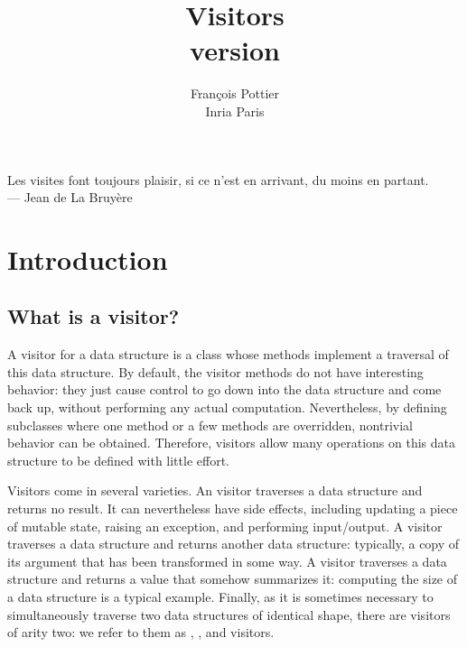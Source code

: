 \documentclass[11pt,a4paper,twoside]{article}
\title{Visitors\\\normalsize version \visitorsversion}
\date{}
\begin{document}
\author{François Pottier\\ Inria Paris\\ }
\maketitle


\clearpage
\tableofcontents
\clearpage


\begin{flushright}
  Les visites font toujours plaisir, si ce n'est en arrivant, du moins en
  partant. \\ --- Jean de La Bruyère
\end{flushright}

\vspace{1cm}


\section{Introduction}
\label{sec:intro}


\subsection{What is a visitor?}

A visitor for a data structure is a class whose methods implement a traversal
of this data structure. By default, the visitor methods do not have
interesting behavior: they just cause control to go down into the data
structure and come back up, without performing any actual computation.
Nevertheless, by defining subclasses where one method or a few methods are
overridden, nontrivial behavior can be obtained. Therefore, visitors allow
many operations on this data structure to be defined with little effort.

Visitors come in several varieties. An \iter visitor traverses a data
structure and returns no result. It can nevertheless have side effects,
including updating a piece of mutable state, raising an exception, and
performing input/output. A \map visitor traverses a data structure and returns
another data structure: typically, a copy of its argument that has been
transformed in some way. A \reduce visitor traverses a data structure and
returns a value that somehow summarizes it: computing the size of a data
structure is a typical example. Finally, as it is sometimes necessary to
simultaneously traverse two data structures of identical shape, there are
visitors of arity two: we refer to them as \itertwo, \maptwo, and \reducetwo
visitors.
\end{document}
